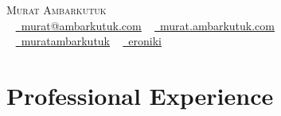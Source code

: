 \documentclass[letterpaper,11pt]{article}
\begin{document}
\nocite{ambarkutuk2024sensors}
\nocite{ambarkutuk2023}
\nocite{ambarkutuk2021uncertainty}
\nocite{sa2021investigation}
\nocite{sa2020towards}
\nocite{ambarkutuk2017grid}
\nocite{ocak2015image}

\begin{center}
    {\Huge \scshape Murat Ambarkutuk} \\ \vspace{1pt}
	~ \href{mailto:murat@ambarkutuk.com}{\raisebox{-0.2\height}\faEnvelope\  \underline{murat@ambarkutuk.com}}
	~ \href{https://murat.ambarkutuk.com}{\raisebox{-0.2\height}\faBookmark\  \underline{murat.ambarkutuk.com}} \\
    ~ \href{https://linkedin.com/in/muratambarkutuk/}{\raisebox{-0.2\height}\faLinkedin\ \underline{muratambarkutuk}}
	~ \href{https://github.com/eroniki}{\raisebox{-0.2\height}\faGithub\ \underline{eroniki}}
	\vspace{-8pt}
\end{center}

\section{Professional Experience}
  \resumeSubHeadingListStart
\end{document}
